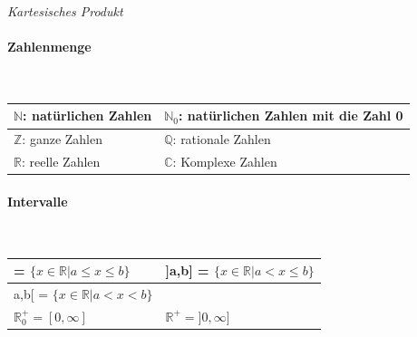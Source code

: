 \noindent
\textit{Kartesisches Produkt}\linebreak
{}
\vspace{1mm}

\paragraph{Zahlenmenge}\mbox{}\\
\begin{tabularx}{\columnwidth}{@{}X|X@{}}
    \hline
    $\mathbb{N}$: natürlichen Zahlen & $\mathbb{N}_0$: natürlichen Zahlen mit die Zahl 0 \\ \hline
    $\mathbb{Z}$: ganze Zahlen       & $\mathbb{Q}$: rationale Zahlen                    \\ \hline
    $\mathbb{R}$: reelle Zahlen      & $\mathbb{C}$: Komplexe Zahlen                     \\ \hline
\end{tabularx}
\vspace{1mm}

\paragraph{Intervalle}\mbox{}\\
\begin{tabularx}{\columnwidth}{@{}X|X@{}}
    \hline
    [a,b] = $\{x \in \mathbb{R} | a \leq  x \leq b \}$ & ]a,b] = $\{x \in \mathbb{R} | a < x \leq b \}$ \\ \hline
    [a,b[ = $\{x \in \mathbb{R} | a \leq  x < b \}$    & ]a,b[ = $\{x \in \mathbb{R} | a < x < b \}$    \\ \hline
    $\mathbb{R}^{+}_0 = [0,\infty]$                    & $\mathbb{R}^{+} = ]0,\infty]$                  \\ \hline
\end{tabularx}
\vspace{1mm}


